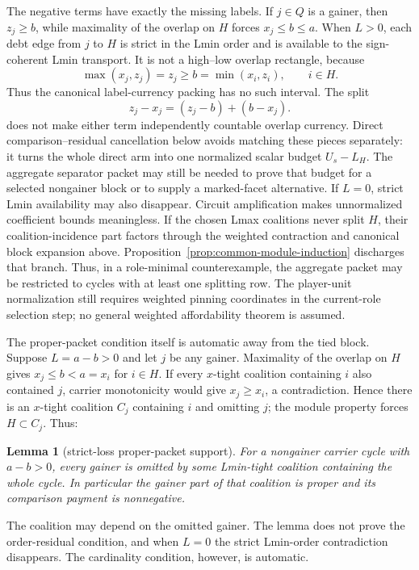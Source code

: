 \documentclass[11pt]{article}
\newtheorem{lemma}[theorem]{Lemma}
\begin{document}
The negative terms have exactly the missing labels.  If $j\in Q$ is a
gainer, then $z_j\ge b$, while maximality of the overlap on $H$ forces
$x_j\le b\le a$.  When $L>0$, each debt edge from $j$ to $H$ is strict in
the Lmin order and is available to the sign-coherent Lmin transport.  It is
not a high--low overlap rectangle, because
\[
 \max(x_j,z_j)=z_j\ge b=\min(x_i,z_i),\qquad i\in H.
\]
Thus the canonical label-currency packing has no such interval.  The split
\[
 z_j-x_j=(z_j-b)+(b-x_j).                            \tag{ASB3}
\]
does not make either term independently countable overlap currency.  Direct
comparison--residual cancellation below avoids matching these pieces
separately: it turns the whole direct arm into one normalized scalar budget
$U_s-L_H$.  The aggregate separator packet may still be needed to prove that
budget for a selected nongainer block or to supply a marked-facet alternative.
If $L=0$, strict Lmin availability may also disappear.  Circuit amplification
makes unnormalized coefficient bounds meaningless.
If the chosen Lmax coalitions never split $H$, their coalition-incidence part
factors through the weighted contraction and canonical block expansion above.
Proposition~\ref{prop:common-module-induction} discharges that branch.  Thus,
in a role-minimal counterexample, the aggregate packet may be restricted to
cycles with at least one splitting row.  The player-unit normalization still
requires weighted pinning coordinates in the current-role selection step;
no general weighted affordability theorem is assumed.

The proper-packet condition itself is automatic away from the tied block.
Suppose $L=a-b>0$ and let $j$ be any gainer.  Maximality of the overlap on
$H$ gives $x_j\le b<a=x_i$ for $i\in H$.  If every $x$-tight coalition
containing $i$ also contained $j$, carrier monotonicity would give
$x_j\ge x_i$, a contradiction.  Hence there is an $x$-tight coalition $C_j$
containing $i$ and omitting $j$; the module property forces $H\subset C_j$.
Thus:

\begin{lemma}[strict-loss proper-packet support]
For a nongainer carrier cycle with $a-b>0$, every gainer is omitted by some
Lmin-tight coalition containing the whole cycle.  In particular the gainer
part of that coalition is proper and its comparison payment is nonnegative.
\end{lemma}

The coalition may depend on the omitted gainer.  The lemma does not prove
the order-residual condition, and when $L=0$ the strict Lmin-order
contradiction disappears.  The cardinality condition, however, is automatic.
\end{document}
